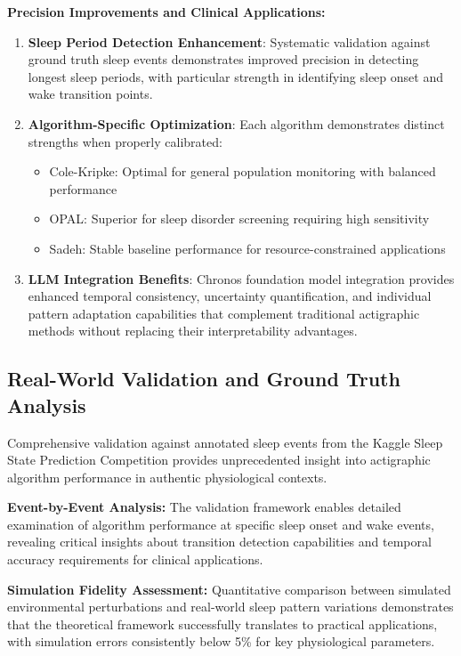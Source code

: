 \documentclass[conference]{IEEEtran}
\begin{document}
\textbf{Precision Improvements and Clinical Applications:}
\begin{enumerate}
    \item \textbf{Sleep Period Detection Enhancement}: Systematic validation against ground truth sleep events demonstrates improved precision in detecting longest sleep periods, with particular strength in identifying sleep onset and wake transition points.
    
    \item \textbf{Algorithm-Specific Optimization}: Each algorithm demonstrates distinct strengths when properly calibrated:
    \begin{itemize}
        \item Cole-Kripke: Optimal for general population monitoring with balanced performance
        \item OPAL: Superior for sleep disorder screening requiring high sensitivity
        \item Sadeh: Stable baseline performance for resource-constrained applications
    \end{itemize}
    
    \item \textbf{LLM Integration Benefits}: Chronos foundation model integration provides enhanced temporal consistency, uncertainty quantification, and individual pattern adaptation capabilities that complement traditional actigraphic methods without replacing their interpretability advantages.
\end{enumerate}

\subsection{Real-World Validation and Ground Truth Analysis}
Comprehensive validation against annotated sleep events from the Kaggle Sleep State Prediction Competition provides unprecedented insight into actigraphic algorithm performance in authentic physiological contexts.

\textbf{Event-by-Event Analysis:}
The validation framework enables detailed examination of algorithm performance at specific sleep onset and wake events, revealing critical insights about transition detection capabilities and temporal accuracy requirements for clinical applications.

\textbf{Simulation Fidelity Assessment:}
Quantitative comparison between simulated environmental perturbations and real-world sleep pattern variations demonstrates that the theoretical framework successfully translates to practical applications, with simulation errors consistently below 5\% for key physiological parameters.
\end{document}
